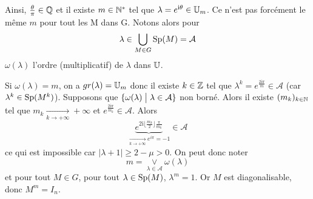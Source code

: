 \begin{solution}
	Ainsi, $\frac{\theta}{\pi}\in\mathbb{Q}$ et il existe $m\in\mathbb{N}^{*}$ tel que $\lambda=e^{\mathrm{i}\theta}\in\mathbb{U}_{m}$. Ce n'est pas forcément le même $m$ pour tout les M dans G. Notons alors pour 
	$$\lambda\in\bigcup_{M\in G}\operatorname{Sp}(M)=\mathcal{A}$$
	$\omega(\lambda)$ l'ordre (multiplicatif) de $\lambda$ dans $\mathbb{U}$.

	Si $\omega(\lambda)=m$, on a $gr(\lambda)=\mathbb{U}_{m}$ donc il existe $k\in\mathbb{Z}$ tel que $\lambda^{k}=e^{\frac{2\mathrm{i}\pi}{m}}\in\mathcal{A}$ (car $\lambda^{k}\in\operatorname{Sp}(M^{k})$). Supposons que $\{\omega(\lambda)\bigm| \lambda\in\mathcal{A}\}$ non borné. Alors il existe $(m_{k})_{k\in\mathbb{N}}$ tel que $m_{k}\xrightarrow[k\to+\infty]{}+\infty$ et $e^{\frac{2\mathrm{i}\pi}{m_{k}}}\in\mathcal{A}$. Alors 
	$$\underbrace{e^{2\mathrm{i}\lfloor\frac{m_{k}}{2}\rfloor \frac{\pi}{m_{k}}}}_{\xrightarrow[k\to+\infty]{} e^{i\pi}=-1}\in\mathcal{A}$$
	ce qui est impossible car $\vert\lambda+1\vert\geqslant2-\mu>0$. On peut donc noter
	$$m=\underset{\lambda\in\mathcal{A}}{\vee}\omega(\lambda)$$
	et pour tout $M\in G$, pour tout $\lambda\in\operatorname{Sp}(M)$, $\lambda^{m}=1$. Or $M$ est diagonalisable, donc $M^{m}=I_{n}$.
\end{solution}

